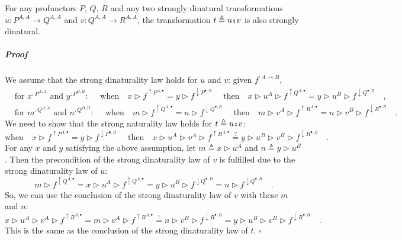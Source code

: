 For any profunctors $P$, $Q$, $R$ and any two strongly dinatural
transformations $u:P^{A,A}\rightarrow Q^{A,A}$ and $v:Q^{A,A}\rightarrow R^{A,A}$,
the transformation $t\triangleq u\bef v$ is also strongly dinatural.

\subparagraph{Proof}

We assume that the strong dinaturality law holds for $u$ and $v$:
given $f^{:A\rightarrow B}$,
\begin{align*}
 & \text{for }x^{:P^{A,A}}\text{ and }y^{:P^{B,B}}:\quad\text{ when}\quad x\triangleright f^{\uparrow P^{A,\bullet}}=y\triangleright f^{\downarrow P^{\bullet,B}}\quad\text{ then}\quad x\triangleright u^{A}\triangleright f^{\uparrow Q^{A,\bullet}}=y\triangleright u^{B}\triangleright f^{\downarrow Q^{\bullet,B}}\quad,\\
 & \text{for }m^{:Q^{A,A}}\text{ and }n^{:Q^{B,B}}:\quad\text{ when}\quad m\triangleright f^{\uparrow Q^{A,\bullet}}=n\triangleright f^{\downarrow Q^{\bullet,B}}\quad\text{ then}\quad m\triangleright v^{A}\triangleright f^{\uparrow R^{A,\bullet}}=n\triangleright v^{B}\triangleright f^{\downarrow R^{\bullet,B}}\quad.
\end{align*}
We need to show that the strong naturality law holds for $t\triangleq u\bef v$:
\[
\text{when}\quad x\triangleright f^{\uparrow P^{A,\bullet}}=y\triangleright f^{\downarrow P^{\bullet,B}}\quad\text{ then}\quad x\triangleright u^{A}\triangleright v^{A}\triangleright f^{\uparrow R^{A,\bullet}}\overset{?}{=}y\triangleright u^{B}\triangleright v^{B}\triangleright f^{\downarrow R^{\bullet,B}}\quad.
\]
For any $x$ and $y$ satisfying the above assumption, let $m\triangleq x\triangleright u^{A}$
and $n\triangleq y\triangleright u^{B}$. Then the precondition of
the strong dinaturality law of $v$ is fulfilled due to the strong
dinaturality law of $u$:
\[
m\triangleright f^{\uparrow Q^{A,\bullet}}=x\triangleright u^{A}\triangleright f^{\uparrow Q^{A,\bullet}}=y\triangleright u^{B}\triangleright f^{\downarrow Q^{\bullet,B}}=n\triangleright f^{\downarrow Q^{\bullet,B}}\quad.
\]
So, we can use the conclusion of the strong dinaturality law of $v$
with these $m$ and $n$:
\[
x\triangleright u^{A}\triangleright v^{A}\triangleright f^{\uparrow R^{A,\bullet}}=m\triangleright v^{A}\triangleright f^{\uparrow R^{A,\bullet}}\overset{!}{=}n\triangleright v^{B}\triangleright f^{\downarrow R^{\bullet,B}}=y\triangleright u^{B}\triangleright v^{B}\triangleright f^{\downarrow R^{\bullet,B}}\quad.
\]
This is the same as the conclusion of the strong dinaturality law
of $t$. $\square$

